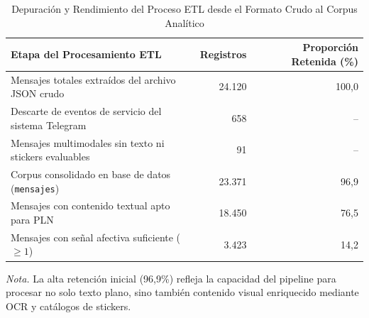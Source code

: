 \begin{table}[htbp]
  \centering
  \small
  \caption{Depuración y Rendimiento del Proceso ETL desde el Formato Crudo al Corpus Analítico}
  \label{tab:resumen_etl}
  \begin{tabular}{lrr}
    \toprule
    Etapa del Procesamiento ETL & Registros & Proporción Retenida (\%) \\
    \midrule
    Mensajes totales extraídos del archivo JSON crudo     & 24.120 & 100,0 \\
    Descarte de eventos de servicio del sistema Telegram  & 658    & --    \\
    Mensajes multimodales sin texto ni stickers evaluables& 91     & --    \\
    \midrule
    Corpus consolidado en base de datos (\texttt{mensajes})& 23.371 & 96,9  \\
    Mensajes con contenido textual apto para PLN          & 18.450 & 76,5  \\
    Mensajes con señal afectiva suficiente ($\ge 1$)      & 3.423  & 14,2  \\
    \bottomrule
  \end{tabular}
  \vspace{4pt}
  \begin{minipage}{0.92\textwidth}
    \footnotesize
    \textit{Nota.} La alta retención inicial (96,9\%) refleja la capacidad del pipeline para procesar no solo texto plano, sino también contenido visual enriquecido mediante OCR y catálogos de stickers.
  \end{minipage}
\end{table}

